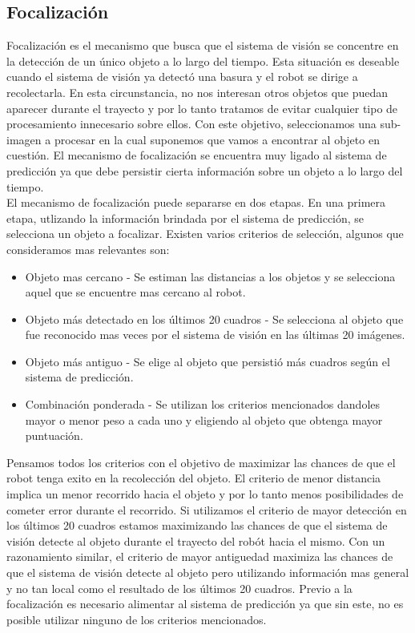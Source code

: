 	\subsection{Focalización}
	Focalización es el mecanismo que busca que el sistema de visión se concentre en la detección de un único objeto a lo largo del tiempo. Esta situación es deseable cuando el sistema de visión ya detectó una basura y el robot se dirige a recolectarla. En esta circunstancia, no nos interesan otros objetos que puedan aparecer durante el trayecto y por lo tanto tratamos de evitar cualquier tipo de procesamiento innecesario sobre ellos. Con este objetivo, seleccionamos una sub-imagen a procesar en la cual suponemos que vamos a encontrar al objeto en cuestión. El mecanismo de focalización se encuentra muy ligado al sistema de predicción ya que debe persistir cierta información sobre un objeto a lo largo del tiempo.\\
\indent El mecanismo de focalización puede separarse en dos etapas. En una primera etapa, utlizando la información brindada por el sistema de predicción, se selecciona un objeto a focalizar. Existen varios criterios de selección, algunos que consideramos mas relevantes son:
\begin{itemize}
\item{ Objeto mas cercano - Se estiman las distancias a los objetos y se selecciona aquel que se encuentre mas cercano al robot.}
\item{ Objeto más detectado en los últimos 20 cuadros - Se selecciona al objeto que fue reconocido mas veces por el sistema de visión en las últimas 20 imágenes.}
\item{ Objeto más antiguo - Se elige al objeto que persistió más cuadros según el sistema de predicción.}
\item{ Combinación ponderada - Se utilizan los  criterios mencionados dandoles mayor o menor peso a cada uno y eligiendo al objeto que obtenga mayor puntuación.}
\end{itemize}
Pensamos todos los criterios con el objetivo de maximizar las chances de que el robot tenga exito en la recolección del objeto. El criterio de menor distancia implica un menor recorrido hacia el objeto y por lo tanto menos posibilidades de cometer error durante el recorrido. Si utilizamos el criterio de mayor detección en los últimos 20 cuadros estamos maximizando las chances de que el sistema de visión detecte al objeto durante el trayecto del robót hacia el mismo. Con un razonamiento similar, el criterio de mayor antiguedad maximiza las chances de que el sistema de visión detecte al objeto pero utilizando información mas general y no tan local como el resultado de los últimos 20 cuadros. Previo a la focalización es necesario alimentar al sistema de predicción ya que sin este, no es posible utilizar ninguno de los criterios mencionados.\\ 
